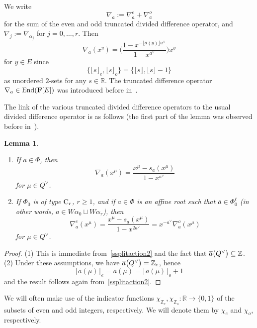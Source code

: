 \documentclass[pdftex]{sigma}
\numberwithin{equation}{section}
\newtheorem{Lemma}[Theorem]{Lemma}
\begin{document}
We write
\begin{equation}\label{Aisum}
\nabla_a:=\nabla_a^e+\nabla_a^o
\end{equation}
for the sum of the even and odd truncated divided difference operator, and $\nabla_j:=\nabla_{\alpha_j}$ for $j=0,\dots,r$. Then
\begin{equation}\label{Aires}
\nabla_a(x^y)=\Biggl(\frac{1-x^{-\lfloor\overline{a}(y)\rfloor a^\vee}}{1-x^{a^\vee}}\Biggr)x^y
\end{equation}
for $y\in E$ since
\begin{equation*}%
\{\lfloor s\rfloor_e,\lfloor s\rfloor_o\}=\{\lfloor s\rfloor,\lfloor s\rfloor-1\}
\end{equation*}
as unordered $2$-sets for any $s\in\mathbb{R}$.
The truncated difference operator $\nabla_a\in\textup{End}(\mathbf{F}[E])$ was introduced before in~\cite[Section~4.2]{SSV2}.

The link of the various truncated divided difference operators to the usual divided difference operator is as follows (the first part of the lemma was observed before in~\cite[Lemma~4.4]{SSV2}).
\begin{Lemma}\label{polredNabla}
\hfill
\begin{enumerate}\itemsep=0pt
\item[$(1)$] If $a\in\Phi$, then
\[
\nabla_a(x^\mu)=\frac{x^\mu-s_a(x^{\mu})}{1-x^{a^\vee}}
\]
for $\mu\in Q^\vee$.
\item[$(2)$] If $\Phi_0$ is of type ${\rm C}_r$, $r\geq 1$, and if $a\in\Phi$ is an affine root such that $\overline{a}\in\Phi_0^\ell$ \textup{(}in other words,
$a\in W\alpha_0\sqcup W\alpha_r$\textup{)},
then
\[
\nabla_a^e(x^\mu)=\frac{x^\mu-s_a(x^{\mu})}{1-x^{2a^\vee}}=x^{-a^\vee}\nabla_a^o(x^\mu)
\]
for $\mu\in Q^\vee$.
\end{enumerate}
\end{Lemma}
\begin{proof}
(1) This is immediate from~\eqref{ssplitaction2} and the fact that $\overline{a}\smash{\bigl(Q^\vee\bigr)}\subseteq\mathbb{Z}$.\\
(2)
Under these assumptions, we have $\overline{a}\smash{\bigl(Q^\vee\bigr)}=\mathbb{Z}_e$, hence
\[
\lfloor \overline{a}(\mu)\rfloor_e=\overline{a}(\mu)=\lfloor \overline{a}(\mu)\rfloor_o+1
\]
and the result follows again from~\eqref{ssplitaction2}.
\end{proof}

We will often make use of the indicator functions $\chi_{\mathbb{Z}_e}, \chi_{\mathbb{Z}_o}\colon \mathbb{R}\rightarrow\{0,1\}$ of the
subsets of even and odd integers, respectively. We will denote them by $\chi_e$ and $\chi_o$, respectively.
\end{document}

